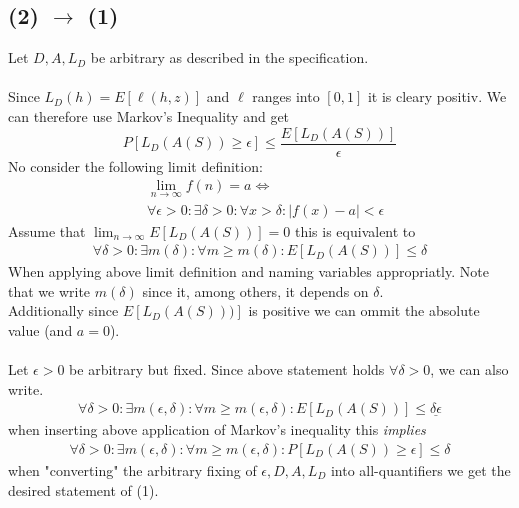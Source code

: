 \documentclass[12pt]{article}
\begin{document}
\subsection*{(2) $\rightarrow$ (1)}
Let $ D,A,L_D$ be arbitrary as described in the specification. \\\\
Since $L_D(h)  = E[\ell(h,z)]$ and $\ell$ ranges into $[0,1]$ it is cleary positiv. We can therefore use Markov's Inequality and get
\begin{equation*}
	P[L_D(A(S)) \geq \epsilon] \leq \frac{E[L_D(A(S))]}{\epsilon}
\end{equation*}
No consider the following limit definition:
\begin{align*}
	&\lim_{n \rightarrow \infty}  f(n)  = a \Leftrightarrow\\
		&\forall \epsilon> 0 :\exists \delta>0 :\forall x > \delta : |f(x) - a| < \epsilon
\end{align*}
Assume that $\lim_{n \rightarrow \infty} E[L_D(A(S))] = 0$ this is equivalent to
\begin{align*}
	\forall \delta> 0 :\exists m(\delta) :\forall m \geq m( \delta) : E[L_D(A(S))] \leq \delta
\end{align*}
When applying above limit definition and naming variables appropriatly. Note that we write $m(\delta)$ since it, among others, it depends on $\delta$.\\
Additionally since $E[L_D(A(S)))]$ is positive we can ommit the absolute value (and $a=0$). \\ \\
Let $\epsilon > 0$ be arbitrary but fixed.
Since above statement holds $\forall \delta>0$, we can also write.
\begin{align*}
	\forall \delta> 0 :\exists m (\epsilon, \delta) :\forall m \geq m( \epsilon,\delta) : E[L_D(A(S))] \leq \underline{\delta \epsilon}
\end{align*}
when inserting above application of Markov's inequality this \textit{implies}
\begin{align*}
	\forall \delta> 0 :\exists m (\epsilon, \delta) :\forall m \geq m( \epsilon, \delta ) : P[L_D(A(S)) \geq \epsilon] \leq \delta
\end{align*}
when "converting" the arbitrary fixing of $\epsilon,D,A,L_D$ into all-quantifiers we get the desired statement of (1).
\end{document}
